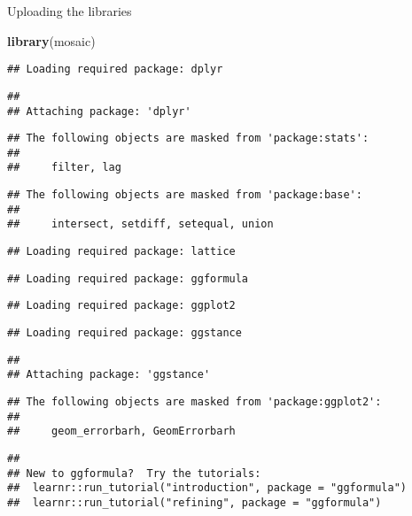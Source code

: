 \documentclass[]{article}
\title{}
\author{}
\date{}
\newenvironment{Shaded}{\begin{snugshade}}{\end{snugshade}}
\newcommand{\KeywordTok}[1]{\textcolor[rgb]{0.13,0.29,0.53}{\textbf{#1}}}
\newcommand{\NormalTok}[1]{#1}
\begin{document}
Uploading the libraries

\begin{Shaded}
\begin{Highlighting}[]
\KeywordTok{library}\NormalTok{(mosaic)}
\end{Highlighting}
\end{Shaded}

\begin{verbatim}
## Loading required package: dplyr
\end{verbatim}

\begin{verbatim}
## 
## Attaching package: 'dplyr'
\end{verbatim}

\begin{verbatim}
## The following objects are masked from 'package:stats':
## 
##     filter, lag
\end{verbatim}

\begin{verbatim}
## The following objects are masked from 'package:base':
## 
##     intersect, setdiff, setequal, union
\end{verbatim}

\begin{verbatim}
## Loading required package: lattice
\end{verbatim}

\begin{verbatim}
## Loading required package: ggformula
\end{verbatim}

\begin{verbatim}
## Loading required package: ggplot2
\end{verbatim}

\begin{verbatim}
## Loading required package: ggstance
\end{verbatim}

\begin{verbatim}
## 
## Attaching package: 'ggstance'
\end{verbatim}

\begin{verbatim}
## The following objects are masked from 'package:ggplot2':
## 
##     geom_errorbarh, GeomErrorbarh
\end{verbatim}

\begin{verbatim}
## 
## New to ggformula?  Try the tutorials: 
##  learnr::run_tutorial("introduction", package = "ggformula")
##  learnr::run_tutorial("refining", package = "ggformula")
\end{verbatim}
\end{document}
